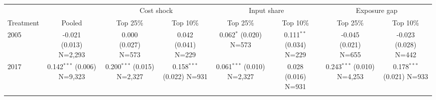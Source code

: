 \begin{tabular}{lccccccc}
\toprule
 & & \multicolumn{2}{c}{Cost shock} & \multicolumn{2}{c}{Input share} & \multicolumn{2}{c}{Exposure gap} \\
\cmidrule(lr){3-4}\cmidrule(lr){5-6}\cmidrule(lr){7-8}
Treatment & Pooled & Top 25\% & Top 10\% & Top 25\% & Top 10\% & Top 25\% & Top 10\% \\
\midrule
2005 & \makecell{-0.021 \\ \footnotesize{(0.013)} \\ \footnotesize{N=2,293}} & \makecell{0.000 \\ \footnotesize{(0.027)} \\ \footnotesize{N=573}} & \makecell{0.042 \\ \footnotesize{(0.041)} \\ \footnotesize{N=229}} & \makecell{0.062$^{*}$ \\ \footnotesize{(0.020)} \\ \footnotesize{N=573}} & \makecell{0.111$^{**}$ \\ \footnotesize{(0.034)} \\ \footnotesize{N=229}} & \makecell{-0.045 \\ \footnotesize{(0.021)} \\ \footnotesize{N=655}} & \makecell{-0.023 \\ \footnotesize{(0.028)} \\ \footnotesize{N=442}} \\\addlinespace
\cmidrule(lr){2-8}
2017 & \makecell{0.142$^{***}$ \\ \footnotesize{(0.006)} \\ \footnotesize{N=9,323}} & \makecell{0.200$^{***}$ \\ \footnotesize{(0.015)} \\ \footnotesize{N=2,327}} & \makecell{0.158$^{***}$ \\ \footnotesize{(0.022)} \\ \footnotesize{N=931}} & \makecell{0.061$^{***}$ \\ \footnotesize{(0.010)} \\ \footnotesize{N=2,327}} & \makecell{0.028 \\ \footnotesize{(0.016)} \\ \footnotesize{N=931}} & \makecell{0.243$^{***}$ \\ \footnotesize{(0.010)} \\ \footnotesize{N=4,253}} & \makecell{0.178$^{***}$ \\ \footnotesize{(0.021)} \\ \footnotesize{N=933}} \\\addlinespace
\bottomrule
\end{tabular}
